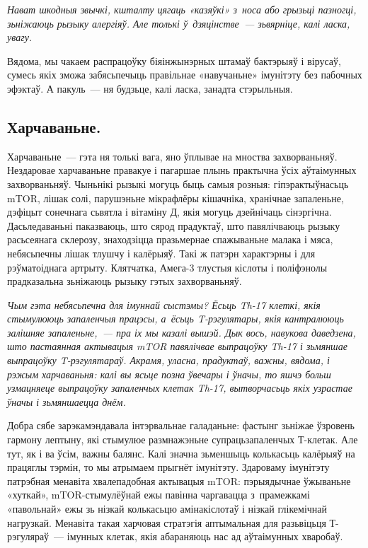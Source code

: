 \emph{Нават шкодныя звычкі, кшталту цягаць «казяўкі» з~носа або грызьці пазногці, зьніжаюць рызыку алергіяў. Але толькі ў~дзяцінстве~--- зьвярніце, калі ласка, увагу.}

Вядома, мы чакаем распрацоўку біяінжынэрных штамаў бактэрыяў і вірусаў, сумесь якіх зможа забясьпечыць правільнае «навучаньне» імунітэту без пабочных эфэктаў. А пакуль~--- ня будзьце, калі ласка, занадта стэрыльныя.

\subsection*{Харчаваньне.}

Харчаваньне~--- гэта ня толькі вага, яно ўплывае на мноства захворваньняў. Нездаровае харчаваньне правакуе і пагаршае плынь практычна ўсіх аўтаімунных захворваньняў. Чыньнікі рызыкі могуць быць самыя розныя: гіпэрактыўнасьць mTOR, лішак солі, парушэньне мікрафлёры кішачніка, хранічнае запаленьне, дэфіцыт сонечнага сьвятла і вітаміну Д, якія могуць дзейнічаць сінэргічна. Дасьледаваньні паказваюць, што сярод прадуктаў, што павялічваюць рызыку расьсеянага склерозу, знаходзіцца празьмернае спажываньне малака і мяса, небясьпечны лішак тлушчу і калёрыяў. Такі ж патэрн характэрны і для рэўматоіднага артрыту. Клятчатка, Амега-3 тлустыя кіслоты і поліфэнолы прадказальна зьніжаюць рызыку гэтых захворваньняў. 


\emph{Чым гэта небясьпечна для імуннай сыстэмы? Ёсьць Th-17 клеткі, якія стымулююць запаленчыя працэсы, а~ёсьць T-рэгулятары, якія кантралююць залішняе запаленьне,~--- пра іх мы казалі вышэй. Дык вось, навукова даведзена, што пастаянная актывацыя mTOR павялічвае выпрацоўку Th-17 і зьмяншае выпрацоўку T-рэгулятараў. Акрамя, уласна, прадуктаў, важны, вядома, і рэжым харчаваньня: калі вы ясьце позна ўвечары і ўначы, то яшчэ больш узмацняеце выпрацоўку запаленчых клетак Th-17, вытворчасьць якіх узрастае ўначы і зьмяншаецца днём.}

Добра сябе зарэкамэндавала інтэрвальнае галаданьне: фастынг зьніжае ўзровень гармону лептыну, які стымулюе размнажэньне супрацьзапаленчых Т-клетак. Але тут, як і ва ўсім, важны балянс. Калі значна зьменшыць колькасьць калёрыяў на працяглы тэрмін, то мы атрымаем прыгнёт імунітэту. Здароваму імунітэту патрэбная менавіта хвалепадобная актывацыя mTOR: пэрыядычнае ўжываньне «хуткай», mTOR-стымулёўнай ежы павінна чаргавацца з~прамежкамі «павольнай» ежы зь нізкай колькасьцю амінакіслотаў і нізкай глікемічнай нагрузкай. Менавіта такая харчовая стратэгія аптымальная для разьвіцьця Т-рэгуляраў~--- імунных клетак, якія абараняюць нас ад аўтаімунных хваробаў.

